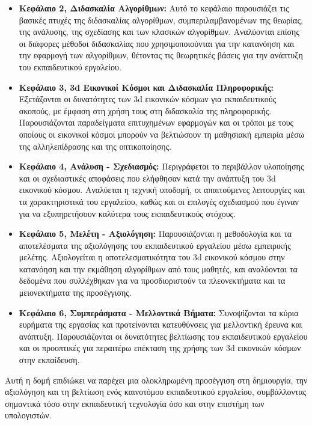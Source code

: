 \begin{itemize}
    \item \textbf{Κεφάλαιο 2, Διδασκαλία Αλγορίθμων:} Αυτό το κεφάλαιο παρουσιάζει τις βασικές πτυχές της διδασκαλίας αλγορίθμων, συμπεριλαμβανομένων της θεωρίας, της ανάλυσης, της σχεδίασης και των κλασικών αλγορίθμων. Αναλύονται επίσης οι διάφορες μέθοδοι διδασκαλίας που χρησιμοποιούνται για την κατανόηση και την εφαρμογή των αλγορίθμων, θέτοντας τις θεωρητικές βάσεις για την ανάπτυξη του εκπαιδευτικού εργαλείου.

    \item \textbf{Κεφάλαιο 3, \acrshort{3d} Εικονικοί Κόσμοι και Διδασκαλία Πληροφορικής:} Εξετάζονται οι δυνατότητες των \acrshort{3d} εικονικών κόσμων για εκπαιδευτικούς σκοπούς, με έμφαση στη χρήση τους στη διδασκαλία της πληροφορικής. Παρουσιάζονται παραδείγματα επιτυχημένων εφαρμογών και οι τρόποι με τους οποίους οι εικονικοί κόσμοι μπορούν να βελτιώσουν τη μαθησιακή εμπειρία μέσω της αλληλεπίδρασης και της οπτικοποίησης.

    \item \textbf{Κεφάλαιο 4, Ανάλυση - Σχεδιασμός:} Περιγράφεται το περιβάλλον υλοποίησης και οι σχεδιαστικές αποφάσεις που ελήφθησαν κατά την ανάπτυξη του \acrshort{3d} εικονικού κόσμου. Αναλύεται η τεχνική υποδομή, οι απαιτούμενες λειτουργίες και τα χαρακτηριστικά του εργαλείου, καθώς και οι επιλογές σχεδιασμού που έγιναν για να εξυπηρετήσουν καλύτερα τους εκπαιδευτικούς στόχους.

    \item \textbf{Κεφάλαιο 5, Μελέτη - Αξιολόγηση:} Παρουσιάζονται η μεθοδολογία και τα αποτελέσματα της αξιολόγησης του εκπαιδευτικού εργαλείου μέσω εμπειρικής μελέτης. Αξιολογείται η αποτελεσματικότητα του \acrshort{3d} εικονικού κόσμου στην κατανόηση και την εκμάθηση αλγορίθμων από τους μαθητές, και αναλύονται τα δεδομένα που συλλέχθηκαν για να προσδιοριστούν τα πλεονεκτήματα και τα μειονεκτήματα της προσέγγισης.

    \item \textbf{Κεφάλαιο 6, Συμπεράσματα - Μελλοντικά Βήματα:} Συνοψίζονται τα κύρια ευρήματα της εργασίας και προτείνονται κατευθύνσεις για μελλοντική έρευνα και ανάπτυξη. Παρουσιάζονται οι δυνατότητες βελτίωσης του εκπαιδευτικού εργαλείου και οι προοπτικές για περαιτέρω επέκταση της χρήσης των \acrshort{3d} εικονικών κόσμων στην εκπαίδευση.
\end{itemize}

Αυτή η δομή επιδιώκει να παρέχει μια ολοκληρωμένη προσέγγιση στη δημιουργία, την αξιολόγηση και τη βελτίωση ενός καινοτόμου εκπαιδευτικού εργαλείου, συμβάλλοντας σημαντικά τόσο στην εκπαιδευτική τεχνολογία όσο και στην επιστήμη των υπολογιστών.
